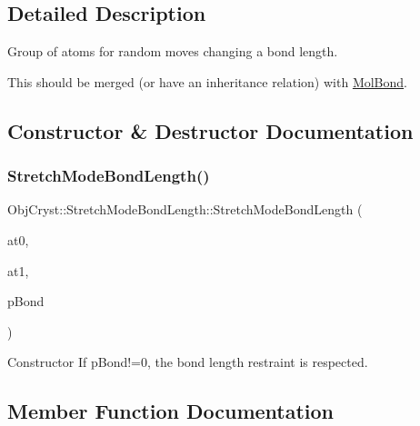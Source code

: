 \subsection{Detailed Description}
Group of atoms for random moves changing a bond length.

This should be merged (or have an inheritance relation) with \mbox{\hyperlink{class_obj_cryst_1_1_mol_bond}{Mol\+Bond}}. 

\subsection{Constructor \& Destructor Documentation}
\mbox{\label{struct_obj_cryst_1_1_stretch_mode_bond_length_aa04e0fdc910b1fcbb25de4de51d32455}} 
\subsubsection{\texorpdfstring{StretchModeBondLength()}{StretchModeBondLength()}}
{\footnotesize\ttfamily Obj\+Cryst\+::\+Stretch\+Mode\+Bond\+Length\+::\+Stretch\+Mode\+Bond\+Length (\begin{DoxyParamCaption}\item[{\mbox{\hyperlink{class_obj_cryst_1_1_mol_atom}{Mol\+Atom}} \&}]{at0,  }\item[{\mbox{\hyperlink{class_obj_cryst_1_1_mol_atom}{Mol\+Atom}} \&}]{at1,  }\item[{const \mbox{\hyperlink{class_obj_cryst_1_1_mol_bond}{Mol\+Bond}} $\ast$}]{p\+Bond }\end{DoxyParamCaption})}

Constructor If p\+Bond!=0, the bond length restraint is respected. 

\subsection{Member Function Documentation}
\mbox{\label{struct_obj_cryst_1_1_stretch_mode_bond_length_ab418eb610ae49059454ca1a2fe7fb9a3}} 
